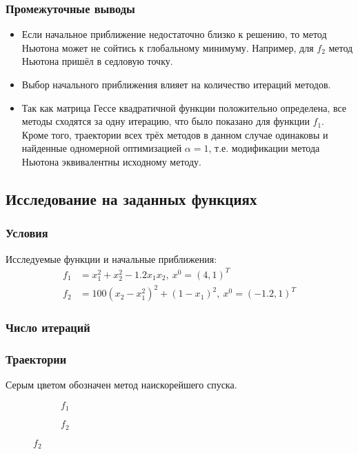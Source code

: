 \subsubsection{Промежуточные выводы}

\begin{itemize}
	\item Если начальное приближение недостаточно близко к решению, то метод Ньютона может не сойтись к глобальному минимуму. Например, для \(f_2\) метод Ньютона пришёл в седловую точку.
	\item Выбор начального приближения влияет на количество итераций методов.
	\item Так как матрица Гессе квадратичной функции положительно определена, все методы сходятся за одну итерацию, что было показано для функции \(f_1\). Кроме того, траектории всех трёх методов в данном случае одинаковы и найденные одномерной оптимизацией \(\alpha = 1\), т.е. модификации метода Ньютона эквивалентны исходному методу.
\end{itemize}

\subsection{Исследование на заданных функциях}

\subsubsection{Условия}

Исследуемые функции и начальные приближения:
\begin{align*}
	f_1 & = x_1^2 + x_2^2 - 1.2x_1x_2,\ x^0 = (4, 1)^T           \\
	f_2 & = 100(x_2 - x_1^2)^2 + (1 - x_1)^2,\ x^0 = (-1.2, 1)^T
\end{align*}

\subsubsection{Число итераций}


\subsubsection{Траектории}

Серым цветом обозначен метод наискорейшего спуска.

\begin{figure}[h]
	\centering
	\begin{subfigure}{.5\textwidth}
		\centering
		
		\caption*{\(f_1\)}
	\end{subfigure}%
	\begin{subfigure}{.5\textwidth}
		\centering
		
		\caption*{\(f_2\)}
	\end{subfigure}
\end{figure}

